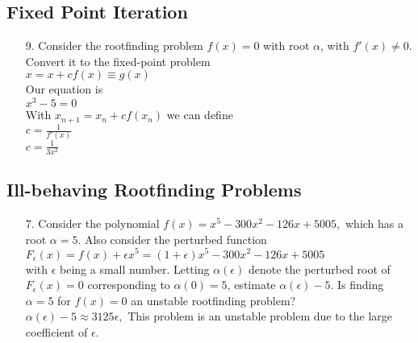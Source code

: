 \documentclass[12pt,letterpaper]{article}
\begin{document}
\subsection{Fixed Point Iteration}
	\begin{enumerate}
		\item[9.] Consider the rootfinding problem $f(x) = 0$ with root $\alpha$, with $f'(x) \neq 0$. Convert it to the fixed-point problem \\
		$x = x + cf(x) \equiv g(x)$ \\
        Our equation is \\
        $x^{3} - 5 = 0$ \\
        With $x_{n+1} = x_{n} + cf(x_{n})$ we can define \\
        $c = \frac{1}{f'(x)}$ \\
        $c = \frac{1}{3x^{2}}$ \\ 
    \end{enumerate}  
\subsection{Ill-behaving Rootfinding Problems}
	\begin{enumerate}
		\item[7.] Consider the polynomial $f(x) = x^{5} - 300x^{2} - 126x + 5005,$ which has a root $\alpha = 5$. Also consider the perturbed function \\
		$F_{\epsilon}(x) = f(x) + \epsilon x^{5} = (1 + \epsilon)x^{5} - 300x^{2} - 126x + 5005$ \\
		with $\epsilon$ being a small number. Letting $\alpha(\epsilon)$ denote the perturbed root of $F_{\epsilon}(x) = 0$ corresponding to $\alpha(0) = 5$, estimate $\alpha(\epsilon) - 5$. Is finding $\alpha = 5$ for $f(x) = 0$ an unstable rootfinding problem? \\
		$\alpha(\epsilon) - 5 \approx 3125\epsilon,$ This problem is an unstable problem due to the large coefficient of $\epsilon$. \\ 
	\end{enumerate} 	
		
			
\end{document}
